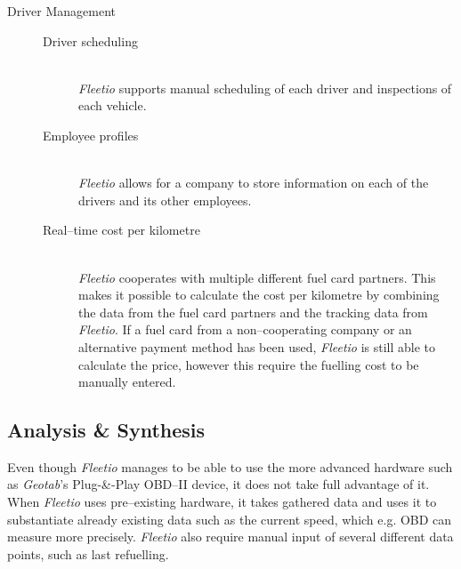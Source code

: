 \begin{description}
    \item[Driver Management] \hfill
    \begin{description}
        \item[Driver scheduling] \hfill \\
        \textit{Fleetio} supports manual scheduling of each driver and inspections of each vehicle.
        \item[Employee profiles] \hfill \\
        \textit{Fleetio} allows for a company to store information on each of the drivers and its other employees.
        \item[Real--time cost per kilometre] \hfill \\
        \textit{Fleetio} cooperates with multiple different fuel card partners.
        This makes it possible to calculate the cost per kilometre by combining the data from the fuel card partners and the tracking data from \textit{Fleetio}.
        If a fuel card from a non--cooperating company or an alternative payment method has been used, \textit{Fleetio} is still able to calculate the price, however this require the fuelling cost to be manually entered.
     \end{description}
\end{description}

\subsection{Analysis \& Synthesis}\label{sub:AandS}
Even though \textit{Fleetio} manages to be able to use the more advanced hardware such as \textit{Geotab}'s Plug-\&-Play OBD--II device, it does not take full advantage of it.
When \textit{Fleetio} uses pre--existing hardware, it takes gathered data and uses it to substantiate already existing data such as the current speed, which e.g. \ac{OBD} can measure more precisely.
\textit{Fleetio} also require manual input of several different data points, such as last refuelling.

